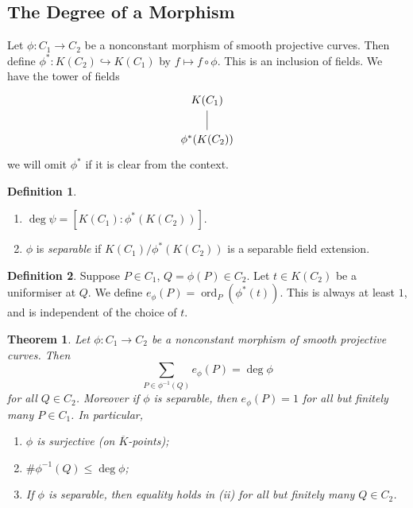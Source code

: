 \documentclass[11pt]{article}
\theoremstyle{definition}
\newtheorem*{definition*}{Definition}
\theoremstyle{plain}
\newtheorem{theorem}[definition]{Theorem}
\theoremstyle{remark}
\DeclareMathOperator{\ord}{ord}
\begin{document}
\subsection*{The Degree of a Morphism}

Let $\phi : C_1 \to C_2$ be a nonconstant morphism of smooth projective curves. Then define $\phi^* : K(C_2) \hookrightarrow K(C_1)$ by $f \mapsto f \circ \phi$. This is an inclusion of fields. We have the tower of fields
\begin{equation*}
\begin{tikzcd}
    K(C_1) \arrow[d, dash]\\
    \phi^*(K(C_2))
\end{tikzcd}
\end{equation*}
we will omit $\phi^*$ if it is clear from the context.

\begin{definition*}\phantom{}
    \begin{enumerate}
        \item $\deg \psi = [K(C_1) : \phi^*(K(C_2))]$.
        \item $\phi$ is \emph{separable} if $K(C_1)/\phi^*(K(C_2))$ is a separable field extension.
    \end{enumerate}
\end{definition*}

\begin{definition*}
    Suppose $P \in C_1$, $Q = \phi(P) \in C_2$. Let $t \in K(C_2)$ be a uniformiser at $Q$. We define $e_\phi(P) = \ord_P(\phi^*(t))$. This is always at least $1$, and is independent of the choice of $t$.
\end{definition*}

\begin{theorem}\label{thm:2_8}
    Let $\phi : C_1 \to C_2$ be a nonconstant morphism of smooth projective curves. Then
    \begin{equation*}
        \sum_{P \in \phi^{-1}(Q)} e_\phi(P) = \deg \phi
    \end{equation*}
    for all $Q \in C_2$. Moreover if $\phi$ is separable, then $e_\phi(P) = 1$ for all but finitely many $P \in C_1$. In particular,
    \begin{enumerate}
        \item $\phi$ is surjective (on $\overline{K}$-points);
        \item $\# \phi^{-1}(Q) \le \deg \phi$;
        \item If $\phi$ is separable, then equality holds in (ii) for all but finitely many $Q \in C_2$.
    \end{enumerate}
\end{theorem}
\end{document}
